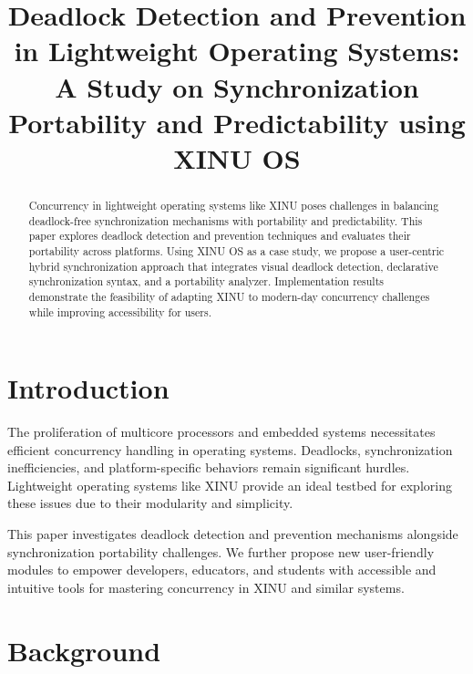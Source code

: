 \documentclass[conference,a4paper]{IEEEtran}
\begin{document}
\title{Deadlock Detection and Prevention in Lightweight Operating Systems: A Study on Synchronization Portability and Predictability using XINU OS}

\author{
}
\maketitle

\begin{abstract}
Concurrency in lightweight operating systems like XINU poses challenges in balancing deadlock-free synchronization mechanisms with portability and predictability. This paper explores deadlock detection and prevention techniques and evaluates their portability across platforms. Using XINU OS as a case study, we propose a user-centric hybrid synchronization approach that integrates visual deadlock detection, declarative synchronization syntax, and a portability analyzer. Implementation results demonstrate the feasibility of adapting XINU to modern-day concurrency challenges while improving accessibility for users.
\end{abstract}

\IEEEpeerreviewmaketitle

\section{Introduction}
The proliferation of multicore processors and embedded systems necessitates efficient concurrency handling in operating systems. Deadlocks, synchronization inefficiencies, and platform-specific behaviors remain significant hurdles. Lightweight operating systems like XINU provide an ideal testbed for exploring these issues due to their modularity and simplicity.

This paper investigates deadlock detection and prevention mechanisms alongside synchronization portability challenges. We further propose new user-friendly modules to empower developers, educators, and students with accessible and intuitive tools for mastering concurrency in XINU and similar systems.

\section{Background}
\end{document}
